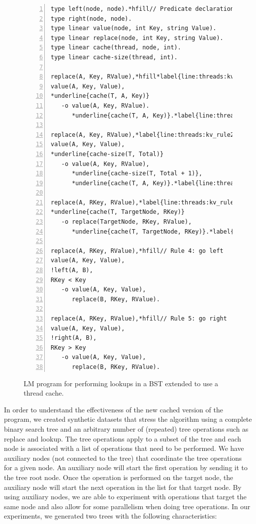 \begin{figure}[ht]
\begin{Verbatim}[numbers=left,fontsize=\codesize,commandchars=*\{\}]
type left(node, node).*hfill// Predicate declaration
type right(node, node).
type linear value(node, int Key, string Value).
type linear replace(node, int Key, string Value).
type linear cache(thread, node, int).
type linear cache-size(thread, int).

replace(A, Key, RValue),*hfill*label{line:threads:kv_rule1_start}// Rule 1: key exists and is also in the cache
value(A, Key, Value),
*underline{cache(T, A, Key)}
   -o value(A, Key, RValue).
      *underline{cache(T, A, Key)}.*label{line:threads:kv_rule1_end}

replace(A, Key, RValue),*label{line:threads:kv_rule2_start}*hfill// Rule 2: key exists and is not in the cache
value(A, Key, Value),
*underline{cache-size(T, Total)}
   -o value(A, Key, RValue),
      *underline{cache-size(T, Total + 1)},
      *underline{cache(T, A, Key)}.*label{line:threads:kv_rule2_end}

replace(A, RKey, RValue),*label{line:threads:kv_rule3_start}*hfill// Rule 3: cached by the thread
*underline{cache(T, TargetNode, RKey)}
   -o replace(TargetNode, RKey, RValue),
      *underline{cache(T, TargetNode, RKey)}.*label{line:threads:kv_rule3_end}

replace(A, RKey, RValue),*hfill// Rule 4: go left
value(A, Key, Value),
!left(A, B),
RKey < Key
   -o value(A, Key, Value),
      replace(B, RKey, RValue).

replace(A, RKey, RValue),*hfill// Rule 5: go right
value(A, Key, Value),
!right(A, B),
RKey > Key
   -o value(A, Key, Value),
      replace(B, RKey, RValue).
\end{Verbatim}
\caption{LM program for performing lookups in a BST extended to use a thread cache.}
\label{code:threads:btree_lookup_cache}
\end{figure}

In order to understand the effectiveness of the new cached version of the
program, we created synthetic datasets that stress the algorithm using a
complete binary search tree and an arbitrary number of (repeated) tree
operations such as replace and lookup. The tree operations apply to a subset of
the tree and each node is associated with a list of operations that need to be
performed. We have auxiliary nodes (not connected to the tree) that coordinate
the tree operations for a given node. An auxiliary node will start the first
operation by sending it to the tree root node. Once the operation is performed
on the target node, the auxiliary node will start the next operation in the list
for that target node. By using auxiliary nodes, we are able to experiment with
operations that target the same node and also allow for some parallelism when
doing tree operations. In our experiments, we generated two trees with the
following characteristics:

